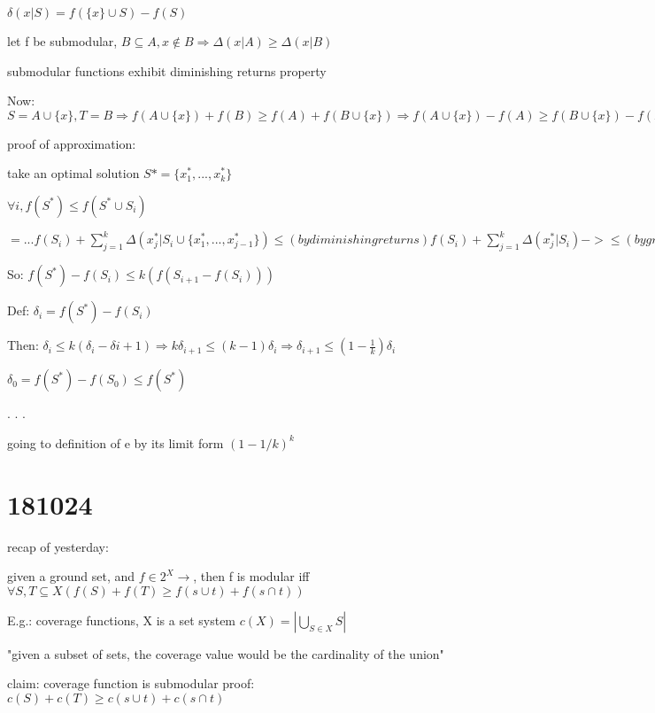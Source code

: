 \documentclass{report}
\begin{document}
	$\delta(x|S) = f(\{x\}\cup S) - f(S)$ %
	
	let f be submodular, $B \subseteq A, x \notin B \Rightarrow \Delta(x|A) \geq \Delta(x|B)$ %
	
	submodular functions exhibit diminishing returns property
	
	Now: $S=A\cup\{x\}, T=B \Rightarrow f(A\cup\{x\})+f(B)\geq f(A)+f(B\cup\{x\}) \Rightarrow f(A\cup\{x\})-f(A)\geq f(B\cup\{x\})-f(B) \Rightarrow \Delta(x|A) \geq \Delta(x|B)$
	
	proof of approximation:
	
	take an optimal solution $S*=\{x_1^*, ..., x_k^*\}$
	
	$\forall i, f(S^*) \leq f(S^* \cup S_i)$ %
	
	$ = ... f(S_i) + \sum_{j=1}^{k}\Delta(x_j^*|S_i\cup \{x_1^*, ..., x_{j-1}^*\}) \leq (bydiminishingreturns) f(S_i) + \sum_{j=1}^{k}\Delta(x_j^*|S_i) -> \leq (bygreediness) f(S_i) + \sum_{j=1}^{k}\Delta(x_{i+1}|S_i) = f(S_i) + k(f(S_i \cup \{x_{i+1}\})-f(S_i)) = kf(S_{i+1}) - (k-1)f(S_i)$
	
	
	So: $f(S^*) - f(S_i) \leq k(f(S_{i+1} - f(S_i)))$
	
	Def: $\delta_i = f(S^*) - f(S_i)$
	
	Then: $\delta_i \leq k(\delta_i - \delta{i+1}) \Rightarrow k\delta_{i+1} \leq (k-1)\delta_i \Rightarrow \delta_{i+1} \leq (1-\frac{1}{k})\delta_i$
	
	$\delta_0 = f(S^*)-f(S_0) \leq f(S^*)$ %
	
	
	.
	.
	.
	
	going to definition of e by its limit form $(1-1/k)^k$
	
	
	\section{181024}
	
	recap of yesterday:
	
	given a ground set, and $f \in 2^X \to \mathbb{}$, then f is modular iff $\forall S, T \subseteq X (f(S)+f(T) \geq f(s\cup t) + f(s \cap t))$
	
	E.g.: coverage functions, X is a set system $c(X) = \left| \bigcup_{S \in X} S \right|$

	"given a subset of sets, the coverage value would be the cardinality of the union"
	
	claim: coverage function is submodular
	proof: $c(S)+c(T) \geq c(s\cup t) + c(s \cap t)$
	
\end{document}
